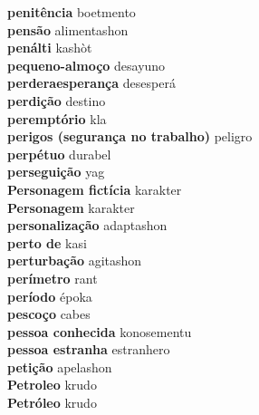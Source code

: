 \textbf{ penitência  } boetmento \\
\textbf{ pensão  } alimentashon \\
\textbf{ penálti  } kashòt \\
\textbf{ pequeno-almoço  } desayuno \\
\textbf{ perderaesperança  } desesperá \\
\textbf{ perdição  } destino \\
\textbf{ peremptório  } kla \\
\textbf{ perigos (segurança no trabalho)  } peligro \\
\textbf{ perpétuo  } durabel \\
\textbf{ perseguição  } yag \\
\textbf{ Personagem fictícia  } karakter \\
\textbf{ Personagem  } karakter \\
\textbf{ personalização  } adaptashon \\
\textbf{ perto de  } kasi \\
\textbf{ perturbação  } agitashon \\
\textbf{ perímetro  } rant \\
\textbf{ período  } époka \\
\textbf{ pescoço  } cabes \\
\textbf{ pessoa conhecida  } konosementu \\
\textbf{ pessoa estranha  } estranhero \\
\textbf{ petição  } apelashon \\
\textbf{ Petroleo  } krudo \\
\textbf{ Petróleo  } krudo \\
